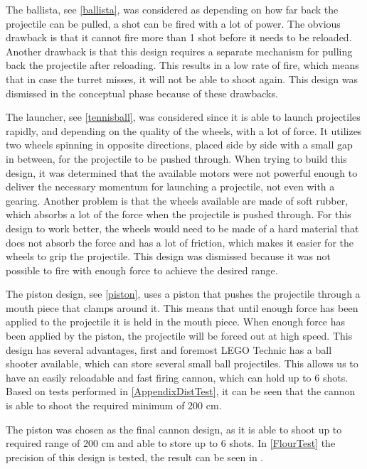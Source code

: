 The ballista, see \autoref{ballista}, was considered as
depending on how far back the projectile can be pulled, a shot can be fired with a lot of power. The obvious drawback is that it cannot fire more than 1 shot before it needs to be reloaded. Another drawback is that this design requires a separate mechanism for pulling back the projectile after reloading. This results in a low rate of fire, which means that in case the turret misses, it will not be able to shoot again. This design was dismissed in the conceptual phase because of these drawbacks.\nl

The launcher, see \autoref{tennisball}, was considered since it is able to launch
projectiles rapidly, and depending on the quality of the wheels, with a lot of force. It utilizes two wheels spinning in opposite directions, placed side by side with a small gap in between, for the projectile to be pushed through. When trying to build this design, it was determined that the available motors were not powerful enough to deliver the necessary momentum for launching a projectile, not even with a gearing. Another problem is that the wheels available are made of soft rubber, which absorbs a lot of the force when the projectile is pushed through. For this design to work better, the wheels would need to be made of a hard material that does not absorb the force and has a lot of friction, which makes it easier for the wheels to grip the projectile. This design was dismissed because it was not possible to fire with enough force to achieve the desired range.\nl

The piston design, see \autoref{piston}, uses a piston that pushes the
projectile through a mouth piece that clamps around it. This means that until enough force has been applied to the projectile it is held in the mouth piece. When enough force has been applied by the piston, the projectile will be forced out at high speed. This
design has several advantages, first and foremost LEGO Technic has a ball shooter available, which can store several small ball projectiles. This allows us to have an easily reloadable and fast firing cannon, which can hold up to 6 shots. Based on tests performed in \autoref{AppendixDistTest}, it can be seen that the cannon is able to shoot the required minimum of 200 cm.


The piston was chosen as the final cannon design, as it is able to shoot up to
required range of 200 cm and able to store up to 6 shots. In \autoref{FlourTest}
the precision of this design is tested, the result can be seen in
\label{graph:Accuracy}.

